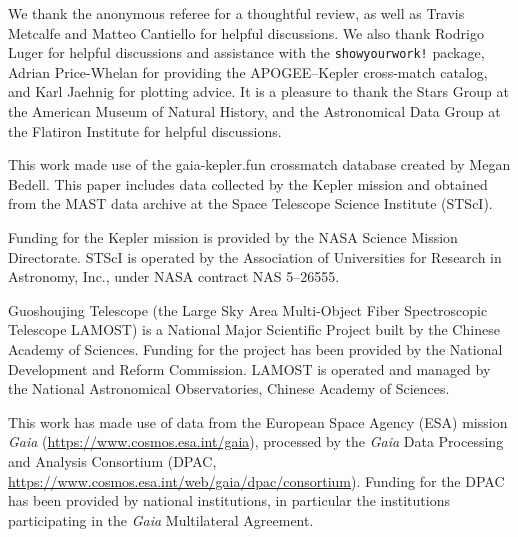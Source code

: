 \documentclass[trackchanges,twocolumn]{aastex631}
\begin{document}
\begin{acknowledgments}
We thank the anonymous referee for a thoughtful review, as well as Travis Metcalfe and Matteo Cantiello for helpful discussions. We also thank Rodrigo Luger for helpful discussions and assistance with the \texttt{showyourwork!} package, Adrian Price-Whelan for providing the APOGEE--Kepler cross-match catalog, and Karl Jaehnig for plotting advice. It is a pleasure to thank the Stars Group at the American Museum of Natural History, and the Astronomical Data Group at the Flatiron Institute for helpful discussions. 

This work made use of the gaia-kepler.fun crossmatch database created by Megan Bedell. This paper includes data collected by the Kepler mission and obtained from the MAST data archive at the Space Telescope Science Institute (STScI). 

Funding for the Kepler mission is provided by the NASA Science Mission Directorate. STScI is operated by the Association of Universities for Research in Astronomy, Inc., under NASA contract NAS 5–26555. 

Guoshoujing Telescope (the Large Sky Area Multi-Object Fiber Spectroscopic Telescope LAMOST) is a National Major Scientific Project built by the Chinese Academy of Sciences. Funding for the project has been provided by the National Development and Reform Commission. LAMOST is operated and managed by the National Astronomical Observatories, Chinese Academy of Sciences. 

This work has made use of data from the European Space Agency (ESA) mission {\it Gaia} (\url{https://www.cosmos.esa.int/gaia}), processed by the {\it Gaia} Data Processing and Analysis Consortium (DPAC, \url{https://www.cosmos.esa.int/web/gaia/dpac/consortium}). Funding for the DPAC has been provided by national institutions, in particular the institutions participating in the {\it Gaia} Multilateral Agreement. 


\end{acknowledgments}
\end{document}
